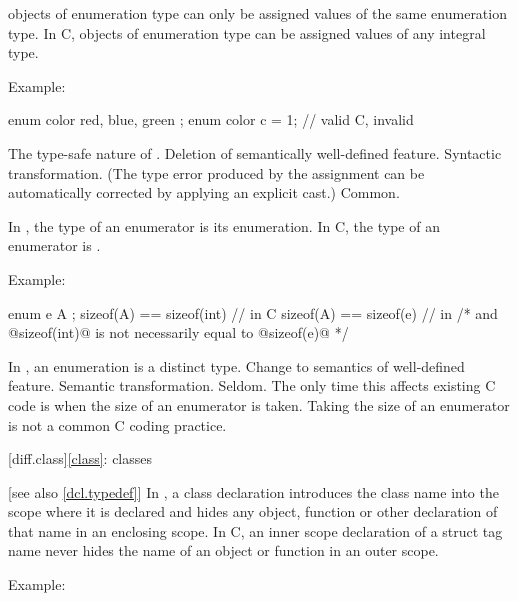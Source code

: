 \change \Cpp{} objects of enumeration type can only be assigned values of the same enumeration type.
In C, objects of enumeration type can be assigned values of any integral type.

Example:
\begin{codeblock}
enum color { red, blue, green };
enum color c = 1;               // valid C, invalid \Cpp{}
\end{codeblock}

\rationale
The type-safe nature of \Cpp{}.
\effect
Deletion of semantically well-defined feature.
\difficulty
Syntactic transformation.
(The type error produced by the assignment can be automatically
corrected by applying an explicit cast.)
\howwide
Common.

\change In \Cpp{}, the type of an enumerator is its enumeration. In C, the type of an enumerator is .

Example:

\begin{codeblock}
enum e { A };
sizeof(A) == sizeof(int)        // in C
sizeof(A) == sizeof(e)          // in \Cpp{}
/* and @sizeof(int)@ is not necessarily equal to @sizeof(e)@ */
\end{codeblock}

\rationale
In \Cpp{}, an enumeration is a distinct type.
\effect
Change to semantics of well-defined feature.
\difficulty
Semantic transformation.
\howwide
Seldom.
The only time this affects existing C code is when the size of an
enumerator is taken.
Taking the size of an enumerator is not a
common C coding practice.

[diff.class]{\ref{class}: classes}

 [see also \ref{dcl.typedef}]
\change In \Cpp{}, a class declaration introduces the class name into the scope where it is
declared and hides any object, function or other declaration of that name in an enclosing
scope. In C, an inner scope declaration of a struct tag name never hides the name of an
object or function in an outer scope.

Example:

